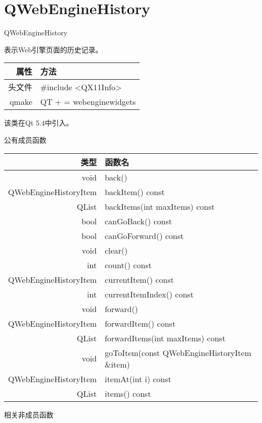 \chapter{QWebEngineHistory}

QWebEngineHistory 

表示Web引擎页面的历史记录。

\begin{tabular}{|r|l|}
	\hline
	属性 & 方法 \\
	\hline
	头文件 & \#include <QX11Info>\\      
	\hline
	qmake & QT + = webenginewidgets \\      
	\hline
\end{tabular}

该类在Qt 5.4中引入。

公有成员函数


\begin{tabular}{|r|l|}
	\hline
	类型 & 函数名 \\
	\hline
	void	& back()\\
	\hline
	QWebEngineHistoryItem	& backItem() const \\
	\hline
	QList&	backItems(int maxItems) const \\
	\hline
	bool	&canGoBack() const \\
	\hline
	bool & canGoForward() const \\ 
	\hline
	void &	clear()\\ 
	\hline
	int &	count() const \\
	\hline
	QWebEngineHistoryItem &currentItem()
	 const \\
	\hline
	int &	currentItemIndex() const \\ 
	\hline
	void &	forward() \\ 
	\hline
	QWebEngineHistoryItem &	forwardItem() const \\ 
	\hline
	QList &	forwardItems(int maxItems) const \\
	\hline
	void &	goToItem(const
    QWebEngineHistoryItem \&item)\\
	\hline
	QWebEngineHistoryItem &	itemAt(int i) const \\ 
	\hline
	QList &	items() const \\ 
	\hline
\end{tabular}

相关非成员函数
